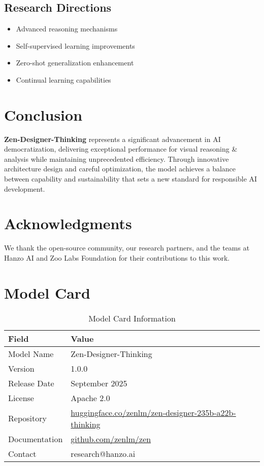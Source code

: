 \documentclass[11pt,a4paper]{article}
\begin{document}
\subsection{Research Directions}
\begin{itemize}
    \item Advanced reasoning mechanisms
    \item Self-supervised learning improvements
    \item Zero-shot generalization enhancement
    \item Continual learning capabilities
\end{itemize}

\section{Conclusion}

\textbf{Zen-Designer-Thinking} represents a significant advancement in AI democratization, 
delivering exceptional performance for visual reasoning & analysis while maintaining 
unprecedented efficiency. Through innovative architecture design and careful optimization, 
the model achieves a balance between capability and sustainability that sets a new standard 
for responsible AI development.

\section*{Acknowledgments}

We thank the open-source community, our research partners, and the teams at Hanzo AI and 
Zoo Labs Foundation for their contributions to this work.




\appendix

\section{Model Card}

\begin{table}[H]
\centering
\begin{tabular}{ll}
\toprule
\textbf{Field} & \textbf{Value} \\
\midrule
Model Name & Zen-Designer-Thinking \\
Version & 1.0.0 \\
Release Date & September 2025 \\
License & Apache 2.0 \\
Repository & \href{https://huggingface.co/zenlm/zen-designer-235b-a22b-thinking}{huggingface.co/zenlm/zen-designer-235b-a22b-thinking} \\
Documentation & \href{https://github.com/zenlm/zen}{github.com/zenlm/zen} \\
Contact & research@hanzo.ai \\
\bottomrule
\end{tabular}
\caption{Model Card Information}
\end{table}
\end{document}
